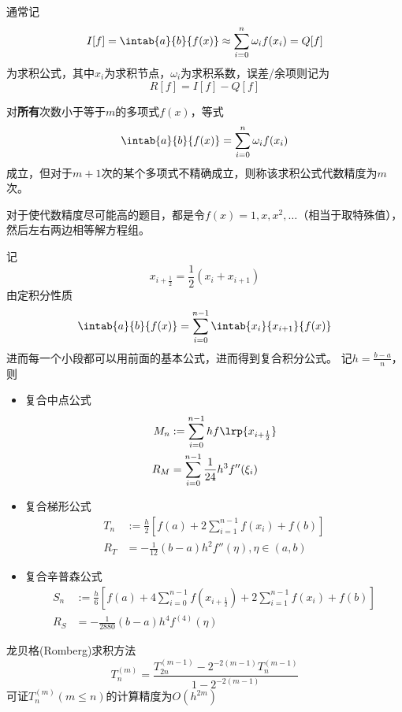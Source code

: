 通常记
\[I[f]=\intab{a}{b}{f(x)}\approx\sum_{i=0}^n\omega_i f(x_i)=Q[f]\]
为求积公式，其中$x_i$为求积节点，$\omega_i$为求积系数，误差/余项则记为
\[R[f]=I[f]-Q[f]\]
\begin{definition}[代数精度]
    对\textbf{所有}次数小于等于$m$的多项式$f(x)$，等式
    \[\intab{a}{b}{f(x)}=\sum_{i=0}^n\omega_i f(x_i)\]
    成立，但对于$m+1$次的某个多项式不精确成立，则称该求积公式代数精度为$m$次。
\end{definition}
对于使代数精度尽可能高的题目，都是令$f(x)=1,x,x^2,\ldots$（相当于取特殊值），然后左右两边相等解方程组。

记
\[x_{i+\frac{1}{2}}=\frac{1}{2}(x_i+x_{i+1})\]
由定积分性质
\[\intab{a}{b}{f(x)}=\sum_{i=0}^{n-1}\intab{x_i}{x_{i+1}}{f(x)}\]
进而每一个小段都可以用前面的基本公式，进而得到复合积分公式。
记$h=\frac{b-a}{n}$，则
\begin{itemize}
\item 复合中点公式
\[\begin{aligned}
    M_n&:=\sum_{i=0}^{n-1}hf\lrp{x_{i+\frac{1}{2}}}\\
    R_M&=\sum_{i=0}^{n-1}\frac{1}{24}h^3f''(\xi_i)
\end{aligned}\]
\item 复合梯形公式
\[\begin{aligned}
    T_n&:=\frac{h}{2}[f(a)+2\sum_{i=1}^{n-1}f(x_i)+f(b)]\\
    R_T&=-\frac{1}{12}(b-a)h^2f''(\eta),\eta\in(a,b)
\end{aligned}\]
\item 复合辛普森公式
\[\begin{aligned}
    S_n&:=\frac{h}{6}\left[f(a)+4\sum_{i=0}^{n-1}f(x_{i+\frac{1}{2}})+2\sum_{i=1}^{n-1}f(x_i)+f(b)\right]\\
    R_S&=-\frac{1}{2880}(b-a)h^4f^{(4)}(\eta)
\end{aligned}\]
\end{itemize}

龙贝格(Romberg)求积方法
\[T_n^{(m)}=\frac{T_{2n}^{(m-1)}-2^{-2(m-1)}T_n^{(m-1)}}{1-2^{-2(m-1)}}\]
可证$T_n^{(m)}(m\leq n)$的计算精度为$O(h^{2m})$

